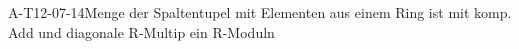 
\begin{EXA}{A-T12-07-14}{Menge der Spaltentupel mit Elementen aus einem Ring ist mit komp. Add und diagonale R-Multip ein R-Moduln}
\end{EXA}
